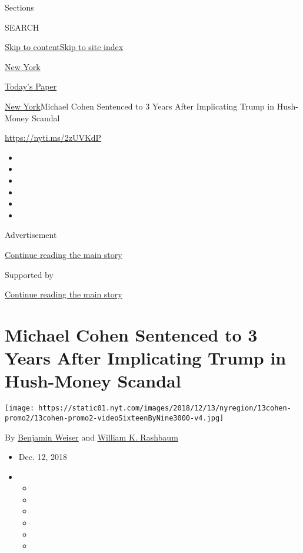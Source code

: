 Sections

SEARCH

\protect\hyperlink{site-content}{Skip to
content}\protect\hyperlink{site-index}{Skip to site index}

\href{https://www.nytimes.com/section/nyregion}{New York}

\href{https://myaccount.nytimes.com/auth/login?response_type=cookie\&client_id=vi}{}

\href{https://www.nytimes.com/section/todayspaper}{Today's Paper}

\href{/section/nyregion}{New York}\textbar{}Michael Cohen Sentenced to 3
Years After Implicating Trump in Hush-Money Scandal

\url{https://nyti.ms/2zUVKdP}

\begin{itemize}
\item
\item
\item
\item
\item
\item
\end{itemize}

Advertisement

\protect\hyperlink{after-top}{Continue reading the main story}

Supported by

\protect\hyperlink{after-sponsor}{Continue reading the main story}

\hypertarget{michael-cohen-sentenced-to-3-years-after-implicating-trump-in-hush-money-scandal}{%
\section{Michael Cohen Sentenced to 3 Years After Implicating Trump in
Hush-Money
Scandal}\label{michael-cohen-sentenced-to-3-years-after-implicating-trump-in-hush-money-scandal}}

\texttt{[image: https://static01.nyt.com/images/2018/12/13/nyregion/13cohen-promo2/13cohen-promo2-videoSixteenByNine3000-v4.jpg]}

By \href{https://www.nytimes.com/by/benjamin-weiser}{Benjamin Weiser}
and \href{https://www.nytimes.com/by/william-k-rashbaum}{William K.
Rashbaum}

\begin{itemize}
\item
  Dec. 12, 2018
\item
  \begin{itemize}
  \item
  \item
  \item
  \item
  \item
  \item
  \end{itemize}
\end{itemize}

